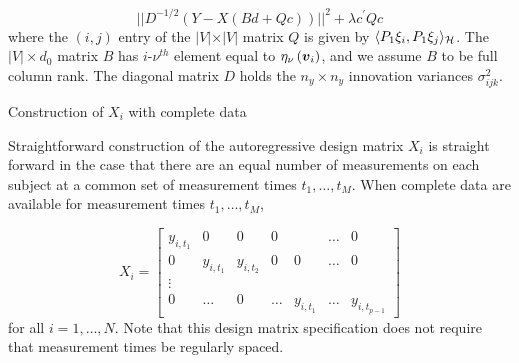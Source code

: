 \begin{equation} \label{eq:ar-design-matrix-1}
\vert \vert D^{-1/2}\left( Y - X \left( Bd + Qc \right) \right) \vert \vert^2  + \lambda c^\prime Q c 
\end{equation}
\noindent
where the $\left(i,j\right)$ entry of the $\vert V \vert \times \vert V \vert$ matrix $Q$ is given by $\langle P_1 \xi_i,  P_1 \xi_j \rangle_{\mathcal{H}}$. The $\vert V \vert \times d_0$ matrix $B$ has $i$-$\nu^{th}$ element equal to $\eta_\nu\left(\mbox{\boldmath $v$}_i\right)$, and we assume $B$ to be full column rank.  The diagonal matrix $D$ holds the $n_y \times n_y$  innovation variances $\sigma^2_{ijk}$. 

\bigskip

\begin{example}{Construction of $X_i$ with complete data} \label{example:construction-of-X}

\vspace{.3cm} 

Straightforward construction of the autoregressive design matrix $X_i$ is straight forward in the case that there are an equal number of measurements on each subject at a common set of measurement times $t_1,\dots, t_M$. When complete data are available for measurement times $t_1, \dots, t_M$, 

\begin{equation}
X_i =  \begin{bmatrix} 
y_{i, t_1} & 0 & 0 &0&& \dots & 0 \\
 0 & y_{i, t_1} &  y_{i, t_2}&0 &0& \dots & 0 \\
 \vdots &&&&&&\\
 0 & \dots &0 & \dots& y_{i,t_1} & \dots &  y_{i, t_{p-1}}
\end{bmatrix}
\end{equation}
\noindent
for all $i = 1,\dots, N$. Note that this design matrix specification does not require that measurement times be regularly spaced.  
\end{example}

